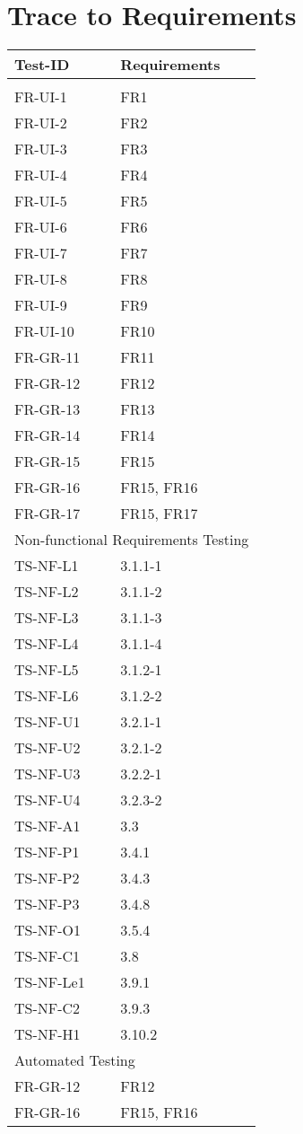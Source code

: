 \documentclass[12pt, titlepage]{article}
\begin{document}
\section{Trace to Requirements}
\begin{longtable}{@{}ll@{}}
\toprule
Test-ID & Requirements \\* \midrule
\endfirsthead
%
\endhead
%
\bottomrule
\endfoot
%
\endlastfoot
%
\multicolumn{2}{l}{Functional Requirements Testing} \\* \midrule
FR-UI-1 & FR1 \\
FR-UI-2 & FR2 \\
FR-UI-3 & FR3 \\
FR-UI-4 & FR4 \\
FR-UI-5 & FR5 \\
FR-UI-6 & FR6 \\
FR-UI-7 & FR7 \\
FR-UI-8 & FR8 \\
FR-UI-9 & FR9 \\
FR-UI-10 & FR10 \\
FR-GR-11 & FR11 \\
FR-GR-12 & FR12 \\
FR-GR-13 & FR13 \\
FR-GR-14 & FR14 \\
FR-GR-15 & FR15 \\
FR-GR-16 & FR15, FR16 \\
FR-GR-17 & FR15, FR17 \\* \midrule
\multicolumn{2}{l}{Non-functional Requirements Testing} \\* \midrule
TS-NF-L1 & 3.1.1-1 \\
TS-NF-L2 & 3.1.1-2 \\
TS-NF-L3 & 3.1.1-3 \\
TS-NF-L4 & 3.1.1-4 \\
TS-NF-L5 & 3.1.2-1 \\
TS-NF-L6 & 3.1.2-2 \\
TS-NF-U1 & 3.2.1-1\\
TS-NF-U2 & 3.2.1-2 \\
TS-NF-U3 & 3.2.2-1 \\
TS-NF-U4 & 3.2.3-2 \\
TS-NF-A1 & 3.3 \\
TS-NF-P1 & 3.4.1 \\
TS-NF-P2 & 3.4.3 \\
TS-NF-P3 & 3.4.8\\
TS-NF-O1 & 3.5.4\\
TS-NF-C1 & 3.8\\
TS-NF-Le1 & 3.9.1\\
TS-NF-C2 & 3.9.3\\
TS-NF-H1 & 3.10.2\\* \midrule
\multicolumn{2}{l}{Automated Testing} \\* \midrule
FR-GR-12 & FR12 \\
FR-GR-16 & FR15, FR16 \\* \bottomrule
\end{longtable}
\end{document}
